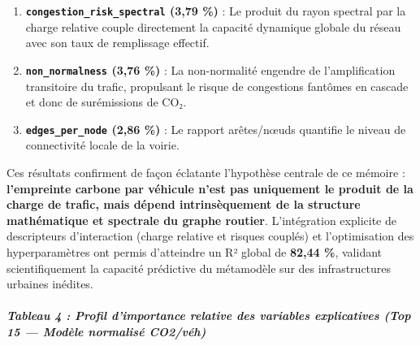 \documentclass[10pt, a4paper]{article}
\begin{document}
\begin{enumerate}
  (proportion de sens uniques) pénalise la fluidité globale en
  allongeant les trajets et en concentrant les véhicules sur des axes
  obligatoires.
\item
  \textbf{\texttt{congestion\_risk\_spectral} (3,79 \%)} : Le produit du
  rayon spectral par la charge relative couple directement la capacité
  dynamique globale du réseau avec son taux de remplissage effectif.
\item
  \textbf{\texttt{non\_normalness} (3,76 \%)} : La non-normalité
  engendre de l'amplification transitoire du trafic, propulsant le
  risque de congestions fantômes en cascade et donc de surémissions de
  CO₂.
\item
  \textbf{\texttt{edges\_per\_node} (2,86 \%)} : Le rapport arêtes/nœuds
  quantifie le niveau de connectivité locale de la voirie.
\end{enumerate}

Ces résultats confirment de façon éclatante l'hypothèse centrale de ce
mémoire : \textbf{l'empreinte carbone par véhicule n'est pas uniquement
le produit de la charge de trafic, mais dépend intrinsèquement de la
structure mathématique et spectrale du graphe routier}. L'intégration
explicite de descripteurs d'interaction (charge relative et risques
couplés) et l'optimisation des hyperparamètres ont permis d'atteindre un
R² global de \textbf{82,44 \%}, validant scientifiquement la capacité
prédictive du métamodèle sur des infrastructures urbaines inédites.

\subparagraph{Tableau 4 : Profil d'importance relative des variables
explicatives (Top 15 --- Modèle normalisé
CO2/véh)}\label{tableau-4-profil-dimportance-relative-des-variables-explicatives-top-15-moduxe8le-normalisuxe9-co2vuxe9h}
\end{document}
